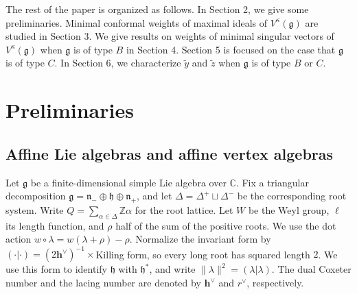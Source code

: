 \documentclass[11pt,a4paper]{amsart}
\newcommand{\CC}{\mathbb C}
\newcommand{\ZZ}{\mathbb Z}
\theoremstyle{plain}
\numberwithin{equation}{section}
\begin{document}
The  rest of the paper is organized as follows.  In Section 2, we give some preliminaries.  Minimal conformal weights of maximal ideals of $V^\kappa(\mathfrak{g})$ are studied in Section 3.  We give results on weights of minimal singular vectors of  $V^\kappa(\mathfrak{g})$  when $\mathfrak{g}$ is of type $B$ in Section 4. Section 5 is focused on the case that $\mathfrak{g}$ is of type $C$. In Section 6, we characterize $\widetilde{y}$ and $\widetilde{z}$ when $\mathfrak{g}$ is of type $B$ or $C$.


 

\section{Preliminaries}\label{sec:preliminaries}
\subsection{Affine Lie algebras and affine vertex algebras}
Let $\mathfrak g$ be a finite-dimensional simple Lie algebra over $\CC$.
Fix a triangular decomposition
\(\mathfrak g=\mathfrak n_-\oplus\mathfrak h\oplus\mathfrak n_+\),
and let $\Delta=\Delta^+\sqcup\Delta^-$ be the corresponding root system.
Write \(Q=\sum_{\alpha\in\Delta}\ZZ\alpha\) for the root lattice. Let $W$ be the Weyl
group, $\ell$ its length function, and $\rho$ half of the sum of the positive
roots. We use the dot action \(w\circ\lambda=w(\lambda+\rho)-\rho\).
Normalize the invariant form by
\((\cdot|\cdot)=(2\mathbf{h}^\vee)^{-1}\times\)Killing form,
so every long root has squared length $2$. We use this form to identify
$\mathfrak h$ with $\mathfrak h^*$, and write
$\|\lambda\|^2=(\lambda|\lambda)$. The dual Coxeter number and the
lacing number are denoted by $\mathbf{h}^\vee$ and $r^\vee$, respectively.
\end{document}
